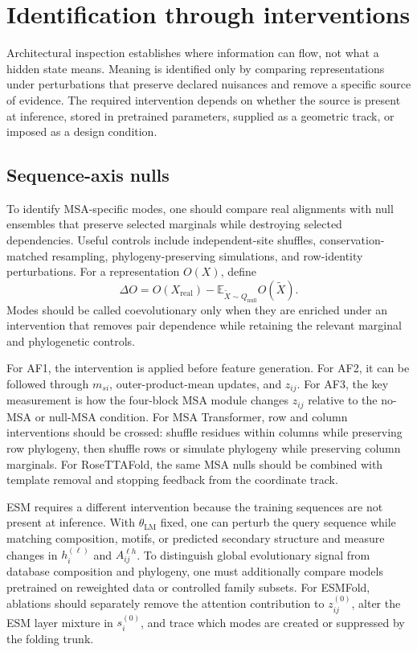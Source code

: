 \documentclass[10pt]{article}
\newcommand{\E}{\mathbb E}
\begin{document}
\section{Identification through interventions}

Architectural inspection establishes where information can flow, not what a hidden state means.
Meaning is identified only by comparing representations under perturbations that preserve declared
nuisances and remove a specific source of evidence.  The required intervention depends on whether
the source is present at inference, stored in pretrained parameters, supplied as a geometric track,
or imposed as a design condition.

\subsection{Sequence-axis nulls}

To identify MSA-specific modes, one should compare real alignments with null ensembles that
preserve selected marginals while destroying selected dependencies.  Useful controls include
independent-site shuffles, conservation-matched resampling, phylogeny-preserving simulations, and
row-identity perturbations.  For a representation $O(X)$, define
\begin{equation}
\Delta O
=O(X_{\mathrm{real}})
-\E_{\widetilde X\sim Q_{\mathrm{null}}}O(\widetilde X).
\label{eq:null-residual}
\end{equation}
Modes should be called coevolutionary only when they are enriched under an intervention that
removes pair dependence while retaining the relevant marginal and phylogenetic controls.

For AF1, the intervention is applied before feature generation.  For AF2, it can be followed
through $m_{si}$, outer-product-mean updates, and $z_{ij}$.  For AF3, the key measurement is how the
four-block MSA module changes $z_{ij}$ relative to the no-MSA or null-MSA condition.
For MSA Transformer, row and column interventions should be crossed: shuffle residues within
columns while preserving row phylogeny, then shuffle rows or simulate phylogeny while preserving
column marginals.  For RoseTTAFold, the same MSA nulls should be combined with template removal and
stopping feedback from the coordinate track.

ESM requires a different intervention because the training sequences are not present at inference.
With $\theta_{\mathrm{LM}}$ fixed, one can perturb the query sequence while matching composition,
motifs, or predicted secondary structure and measure changes in $h_i^{(\ell)}$ and
$A_{ij}^{\ell h}$.  To distinguish global evolutionary signal from database composition and
phylogeny, one must additionally compare models pretrained on reweighted data or controlled family
subsets.  For ESMFold, ablations should separately remove the attention contribution to
$z_{ij}^{(0)}$, alter the ESM layer mixture in $s_i^{(0)}$, and trace which modes are created or
suppressed by the folding trunk.
\end{document}
